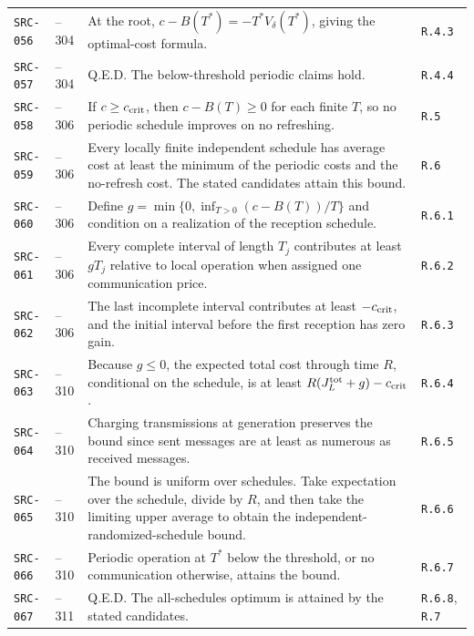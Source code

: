 \documentclass[11pt,letterpaper]{article}
\begin{document}
{\begin{longtable}{>{\raggedright\arraybackslash}p{.12\linewidth}>{\raggedright\arraybackslash}p{.12\linewidth}>{\raggedright\arraybackslash}p{.48\linewidth}>{\raggedright\arraybackslash}p{.19\linewidth}}
\texttt{SRC-056} & 304--304 & At the root, $c-B(T^*)=-T^*V_\delta(T^*)$, giving the optimal-cost formula. & \texttt{R.4.3} \\[3pt]
\texttt{SRC-057} & 304--304 & Q.E.D. The below-threshold periodic claims hold. & \texttt{R.4.4} \\[3pt]
\texttt{SRC-058} & 304--306 & If $c\ge c_{\rm crit}$, then $c-B(T)\ge0$ for each finite $T$, so no periodic schedule improves on no refreshing. & \texttt{R.5} \\[3pt]
\texttt{SRC-059} & 306--306 & Every locally finite independent schedule has average cost at least the minimum of the periodic costs and the no-refresh cost. The stated candidates attain this bound. & \texttt{R.6} \\[3pt]
\texttt{SRC-060} & 306--306 & Define $g=\min\{0,\inf_{T>0}(c-B(T))/T\}$ and condition on a realization of the reception schedule. & \texttt{R.6.1} \\[3pt]
\texttt{SRC-061} & 306--306 & Every complete interval of length $T_j$ contributes at least $gT_j$ relative to local operation when assigned one communication price. & \texttt{R.6.2} \\[3pt]
\texttt{SRC-062} & 306--306 & The last incomplete interval contributes at least $-c_{\rm crit}$, and the initial interval before the first reception has zero gain. & \texttt{R.6.3} \\[3pt]
\texttt{SRC-063} & 306--310 & Because $g\le0$, the expected total cost through time $R$, conditional on the schedule, is at least $R(J_L^{\rm tot}+g)-c_{\rm crit}$. & \texttt{R.6.4} \\[3pt]
\texttt{SRC-064} & 310--310 & Charging transmissions at generation preserves the bound since sent messages are at least as numerous as received messages. & \texttt{R.6.5} \\[3pt]
\texttt{SRC-065} & 310--310 & The bound is uniform over schedules. Take expectation over the schedule, divide by $R$, and then take the limiting upper average to obtain the independent-randomized-schedule bound. & \texttt{R.6.6} \\[3pt]
\texttt{SRC-066} & 310--310 & Periodic operation at $T^*$ below the threshold, or no communication otherwise, attains the bound. & \texttt{R.6.7} \\*[3pt]
\texttt{SRC-067} & 310--311 & Q.E.D. The all-schedules optimum is attained by the stated candidates. & \texttt{R.6.8}, \texttt{R.7} \\[3pt]
\end{longtable}}
\end{document}
